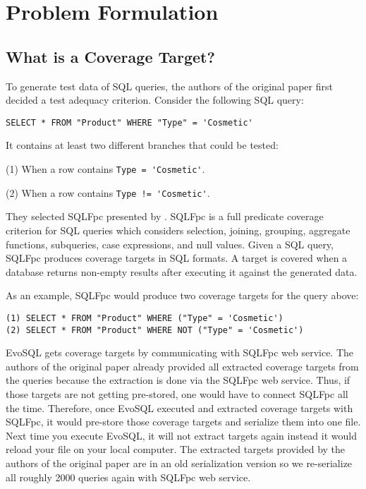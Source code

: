 \chapter{Problem Formulation}

\section{What is a Coverage Target?}
\label{sec:what_is_a_coverage_target}

To generate test data of SQL queries, the authors of the original paper first decided a test adequacy criterion. Consider the following SQL query:

\begin{verbatim}
SELECT * FROM "Product" WHERE "Type" = 'Cosmetic'
\end{verbatim}
It contains at least two different branches that could be tested:

(1) When a row contains \verb|Type = 'Cosmetic'|.

(2) When a row contains \verb|Type != 'Cosmetic'|.

They selected SQLFpc presented by \cite{de2010constraint}. SQLFpc is a full predicate coverage criterion for SQL queries which considers selection, joining, grouping, aggregate functions, subqueries, case expressions, and null values. Given a SQL query, SQLFpc produces coverage targets in SQL formats. A target is covered when a database returns non-empty results after executing it against the generated data.

As an example, SQLFpc would produce two coverage targets for the query above:
\begin{verbatim}
(1) SELECT * FROM "Product" WHERE ("Type" = 'Cosmetic')
(2) SELECT * FROM "Product" WHERE NOT ("Type" = 'Cosmetic')
\end{verbatim}

EvoSQL gets coverage targets by communicating with SQLFpc web service. The authors of the original paper already provided all extracted coverage targets from the queries because the extraction is done via the SQLFpc web service. Thus, if those targets are not getting pre-stored, one would have to connect SQLFpc all the time. Therefore, once EvoSQL executed and extracted coverage targets with SQLFpc, it would pre-store those coverage targets and serialize them into one file. Next time you execute EvoSQL, it will not extract targets again instead it would reload your file on your local computer. 
The extracted targets provided by the authors of the original paper are in an old serialization version so we re-serialize all roughly 2000 queries again with SQLFpc web service.

